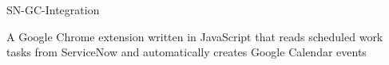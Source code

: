 \documentclass[]{awesome-cv}
\begin{document}
\begin{cventries}
	\cventry
	{}
	{SN-GC-Integration}
	{}
	{}
	{\begin{cvitems}
		\vspace{-4mm}
		\item {A Google Chrome extension written in JavaScript that reads scheduled work tasks from ServiceNow and automatically creates Google Calendar events}
		\end{cvitems}}
\end{cventries}

\end{document}
